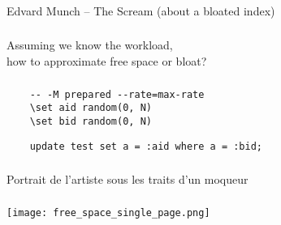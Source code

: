 \documentclass[usenames,dvipsnames, 18pt, compress, aspectratio=169]{beamer}
\begin{document}
\begin{frame}[fragile]{}
    \frametitle{}

    \begin{center}
     { \hspace{1.8cm} Edvard Munch -- The Scream (about a bloated index) }
	\end{center}

\end{frame}

\begin{frame}[fragile]{}
    \frametitle{}

    Assuming we know the workload,\\
    how to approximate free space or bloat?
\end{frame}

\begin{frame}[fragile]{}
    \frametitle{}

    \begin{verbatim}
    -- -M prepared --rate=max-rate
    \set aid random(0, N)
    \set bid random(0, N)
    \end{verbatim}

    \begin{verbatim}
    update test set a = :aid where a = :bid;
    \end{verbatim}

\end{frame}

\begin{frame}[fragile]{}
    \frametitle{}

    \begin{center}
     { \hspace{2.0cm} Portrait de l'artiste sous les traits d'un moqueur }
	\end{center}

\end{frame}

\begin{frame}[fragile]{}
    \frametitle{}
    \begin{center}

        \texttt{[image: free\_space\_single\_page.png]}

    \end{center}
\end{frame}
\end{document}
